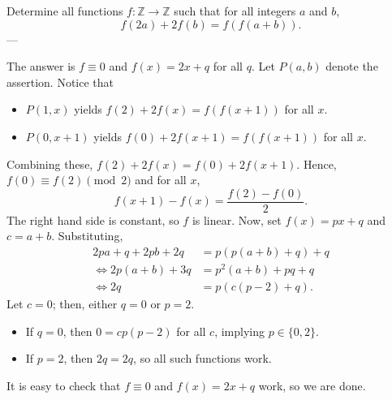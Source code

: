 Determine all functions $f:\mathbb Z\to\mathbb Z$ such that for all integers $a$ and $b$, \[f(2a)+2f(b)=f(f(a+b)).\]
---

The answer is $f\equiv0$ and $f(x)=2x+q$ for all $q$. Let $P(a,b)$ denote the assertion. Notice that
\begin{itemize}
    \item $P(1,x)$ yields $f(2)+2f(x)=f(f(x+1))$ for all $x$.
        \vspace{-0.5em}
    \item $P(0,x+1)$ yields $f(0)+2f(x+1)=f(f(x+1))$ for all $x$.
\end{itemize}
Combining these, $f(2)+2f(x)=f(0)+2f(x+1)$. Hence, $f(0)\equiv f(2)\pmod2$ and for all $x$, \[f(x+1)-f(x)=\frac{f(2)-f(0)}2.\]
The right hand side is constant, so $f$ is linear. Now, set $f(x)=px+q$ and $c=a+b$. Substituting,
\begin{align*}
    2pa+q+2pb+2q&=p(p(a+b)+q)+q\\
    \iff2p(a+b)+3q&=p^2(a+b)+pq+q\\
    \iff2q&=p(c(p-2)+q).
\end{align*}
Let $c=0$; then, either $q=0$ or $p=2$.
\begin{itemize}
    \item If $q=0$, then $0=cp(p-2)$ for all $c$, implying $p\in\{0,2\}$.
        \vspace{-0.5em}
    \item If $p=2$, then $2q=2q$, so all such functions work.
\end{itemize}
It is easy to check that $f\equiv0$ and $f(x)=2x+q$ work, so we are done.


